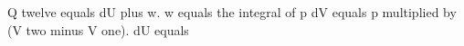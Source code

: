Q twelve equals dU plus w.  
w equals the integral of p dV equals p multiplied by (V two minus V one).  
dU equals